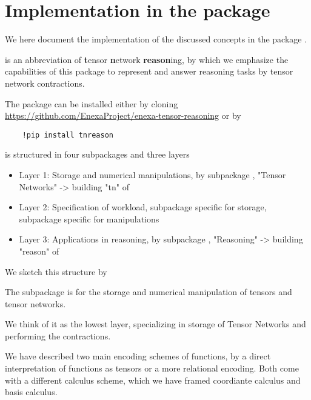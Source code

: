 \chapter{Implementation in the \tnreason package}\label{cha:implementation}

We here document the implementation of the discussed concepts in the \python package \tnreason.
 
\tnreason is an abbreviation of \textbf{t}ensor \textbf{n}etwork \textbf{reason}ing, by which we emphasize the capabilities of this package to represent and answer reasoning tasks by tensor network contractions. 

The package can be installed either by cloning \href{https://github.com/EnexaProject/enexa-tensor-reasoning}{https://github.com/EnexaProject/enexa-tensor-reasoning} or by
\begin{lstlisting}
	!pip install tnreason
\end{lstlisting}


\tnreason is structured in four subpackages and three layers
\begin{itemize}
	\item Layer 1: Storage and numerical manipulations, by subpackage \spengine, "Tensor Networks" -> building "tn" of \tnreason
	\item Layer 2: Specification of workload, subpackage \spencoding specific for storage, subpackage \spalgorithms specific for manipulations
	\item Layer 3: Applications in reasoning, by subpackage \spknowledge, "Reasoning" -> building "reason" of \tnreason
\end{itemize}

We sketch this structure by
\begin{center}

\end{center}




The \spengine subpackage is for the storage and numerical manipulation of tensors and tensor networks.

We think of it as the lowest layer, specializing in storage of Tensor Networks and performing the contractions.


We have described two main encoding schemes of functions, by a direct interpretation of functions as tensors or a more relational encoding.
Both come with a different calculus scheme, which we have framed coordiante calculus and basis calculus.




